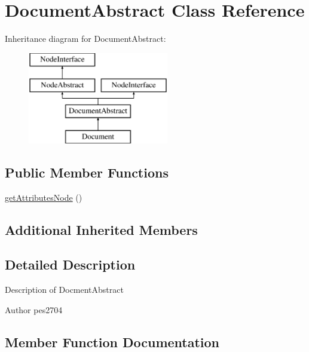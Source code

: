 \hypertarget{class_pes_1_1_dom_1_1_node_1_1_document_1_1_document_abstract}{}\section{Document\+Abstract Class Reference}
\label{class_pes_1_1_dom_1_1_node_1_1_document_1_1_document_abstract}
Inheritance diagram for Document\+Abstract\+:\begin{figure}[H]
\begin{center}
\leavevmode
\includegraphics[height=4.000000cm]{class_pes_1_1_dom_1_1_node_1_1_document_1_1_document_abstract}
\end{center}
\end{figure}
\subsection*{Public Member Functions}
\begin{DoxyCompactItemize}
\item 
\mbox{\hyperlink{class_pes_1_1_dom_1_1_node_1_1_document_1_1_document_abstract_a4722e7722b245351681b05d35f6694f3}{get\+Attributes\+Node}} ()
\end{DoxyCompactItemize}
\subsection*{Additional Inherited Members}


\subsection{Detailed Description}
Description of Docment\+Abstract

\begin{DoxyAuthor}{Author}
pes2704 
\end{DoxyAuthor}


\subsection{Member Function Documentation}
\mbox{\label{class_pes_1_1_dom_1_1_node_1_1_document_1_1_document_abstract_a4722e7722b245351681b05d35f6694f3}} 
